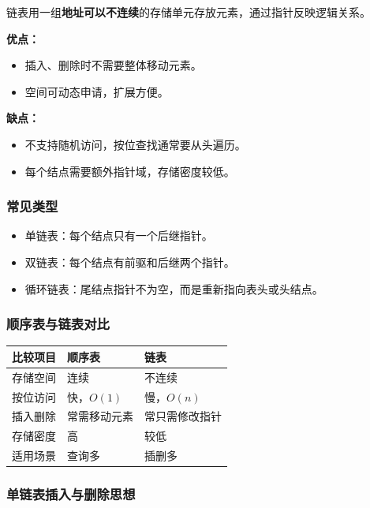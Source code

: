 \documentclass{../../note}
\begin{document}
链表用一组\textbf{地址可以不连续}的存储单元存放元素，通过指针反映逻辑关系。

\textbf{优点：}
\begin{itemize}
  \item 插入、删除时不需要整体移动元素。
  \item 空间可动态申请，扩展方便。
\end{itemize}

\textbf{缺点：}
\begin{itemize}
  \item 不支持随机访问，按位查找通常要从头遍历。
  \item 每个结点需要额外指针域，存储密度较低。
\end{itemize}

\subsubsection{常见类型}

\begin{itemize}
  \item 单链表：每个结点只有一个后继指针。
  \item 双链表：每个结点有前驱和后继两个指针。
  \item 循环链表：尾结点指针不为空，而是重新指向表头或头结点。
\end{itemize}

\subsubsection{顺序表与链表对比}

\begin{center}
\begin{tabular}{|>{\centering\arraybackslash}m{2.6cm}|>{\centering\arraybackslash}m{4cm}|>{\centering\arraybackslash}m{4cm}|}
\hline
比较项目 & 顺序表 & 链表 \\
\hline
存储空间 & 连续 & 不连续 \\
\hline
按位访问 & 快，$O(1)$ & 慢，$O(n)$ \\
\hline
插入删除 & 常需移动元素 & 常只需修改指针 \\
\hline
存储密度 & 高 & 较低 \\
\hline
适用场景 & 查询多 & 插删多 \\
\hline
\end{tabular}
\end{center}

\subsubsection{单链表插入与删除思想}
\end{document}
